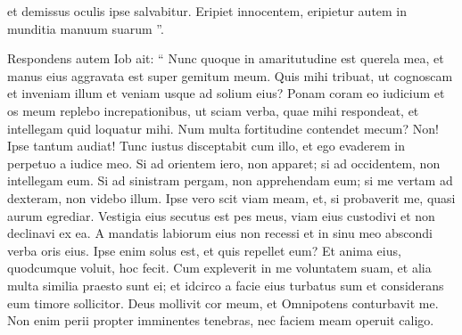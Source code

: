 \begin{biblechapter}
\begin{biblechapter}
\begin{biblechapter}
\begin{biblechapter}
\begin{biblechapter}
\begin{biblechapter}
\begin{biblechapter}
\begin{biblechapter}
\begin{biblechapter}
\begin{biblechapter}
\begin{biblechapter}
\begin{biblechapter}
\begin{biblechapter}
\begin{biblechapter}
\begin{biblechapter}
\begin{biblechapter}
\begin{biblechapter}
\begin{biblechapter}
\begin{biblechapter}
\begin{biblechapter}
\begin{biblechapter}
\begin{biblechapter}
 et demissus oculis ipse salvabitur.
 \verse Eripiet innocentem,
 eripietur autem in munditia manuum suarum ”.
 
\begin{biblechapter}
\verse Respondens autem Iob ait:
 \verse “ Nunc quoque in amaritutudine est querela mea,
 et manus eius aggravata est super gemitum meum.
 \verse Quis mihi tribuat, ut cognoscam et inveniam illum
 et veniam usque ad solium eius?
 \verse Ponam coram eo iudicium
 et os meum replebo increpationibus,
 \verse ut sciam verba, quae mihi respondeat,
 et intellegam quid loquatur mihi.
 \verse Num multa fortitudine contendet mecum?
 Non! Ipse tantum audiat!
 \verse Tunc iustus disceptabit cum illo,
 et ego evaderem in perpetuo a iudice meo.
 \verse Si ad orientem iero, non apparet;
 si ad occidentem, non intellegam eum.
 \verse Si ad sinistram pergam, non apprehendam eum;
 si me vertam ad dexteram, non videbo illum.
 \verse Ipse vero scit viam meam,
 et, si probaverit me, quasi aurum egrediar.
 \verse Vestigia eius secutus est pes meus,
 viam eius custodivi et non declinavi ex ea.
 \verse A mandatis labiorum eius non recessi
 et in sinu meo abscondi verba oris eius.
 \verse Ipse enim solus est, et quis repellet eum?
 Et anima eius, quodcumque voluit, hoc fecit.
 \verse Cum expleverit in me voluntatem suam,
 et alia multa similia praesto sunt ei;
 \verse et idcirco a facie eius turbatus sum
 et considerans eum timore sollicitor.
 \verse Deus mollivit cor meum,
 et Omnipotens conturbavit me.
 \verse Non enim perii propter imminentes tenebras,
 nec faciem meam operuit caligo.
 

\end{biblechapter}
\end{biblechapter}
\end{biblechapter}
\end{biblechapter}
\end{biblechapter}
\end{biblechapter}
\end{biblechapter}
\end{biblechapter}
\end{biblechapter}
\end{biblechapter}
\end{biblechapter}
\end{biblechapter}
\end{biblechapter}
\end{biblechapter}
\end{biblechapter}
\end{biblechapter}
\end{biblechapter}
\end{biblechapter}
\end{biblechapter}
\end{biblechapter}
\end{biblechapter}
\end{biblechapter}
\end{biblechapter}
